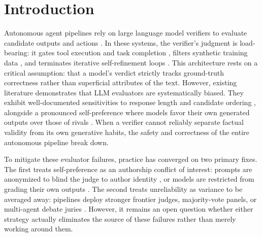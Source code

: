 \section{Introduction}
\label{sec:intro}

Autonomous agent pipelines rely on large language model verifiers to evaluate candidate outputs and actions \citep{zheng2023judging}. In these systems, the verifier's judgment is load-bearing: it gates tool execution and task completion \citep{shinn2024reflexion}, filters synthetic training data \citep{bai2022constitutional}, and terminates iterative self-refinement loops \citep{madaan2023self}. This architecture rests on a critical assumption: that a model's verdict strictly tracks ground-truth correctness rather than superficial attributes of the text. However, existing literature demonstrates that LLM evaluators are systematically biased. They exhibit well-documented sensitivities to response length and candidate ordering \citep{zheng2023judging,wang2024large}, alongside a pronounced self-preference where models favor their own generated outputs over those of rivals \citep{zheng2023judging,panickssery2024llm}. When a verifier cannot reliably separate factual validity from its own generative habits, the safety and correctness of the entire autonomous pipeline break down.

To mitigate these evaluator failures, practice has converged on two primary fixes. The first treats self-preference as an authorship conflict of interest: prompts are anonymized to blind the judge to author identity \citep{zheng2023judging,dubois2023alpacafarm}, or models are restricted from grading their own outputs \citep{panickssery2024llm}. The second treats unreliability as variance to be averaged away: pipelines deploy stronger frontier judges, majority-vote panels, or multi-agent debate juries \citep{verga2024replacing,chan2024chateval}. However, it remains an open question whether either strategy actually eliminates the source of these failures rather than merely working around them.

